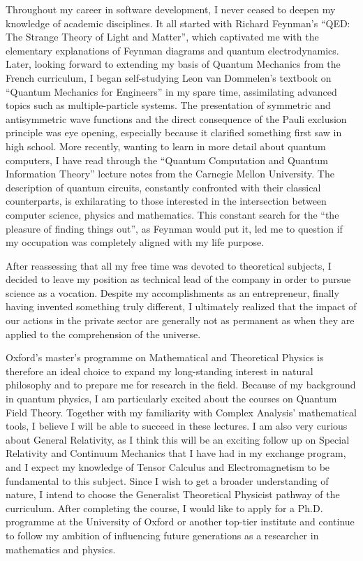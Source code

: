 \documentclass[10pt]{article}
\begin{document}
Throughout my career in software development, I never ceased to deepen my knowledge of academic disciplines. It all started with Richard Feynman's ``QED: The Strange Theory of Light and Matter'', which captivated me with the elementary explanations of Feynman diagrams and quantum electrodynamics. Later, looking forward to extending my basis of Quantum Mechanics from the French curriculum, I began self-studying Leon van Dommelen's textbook on ``Quantum Mechanics for Engineers'' in my spare time, assimilating advanced topics such as multiple-particle systems. The presentation of symmetric and antisymmetric wave functions and the direct consequence of the Pauli exclusion principle was eye opening, especially because it clarified something first saw in high school. More recently, wanting to learn in more detail about quantum computers, I have read through the ``Quantum Computation and Quantum Information Theory'' lecture notes from the Carnegie Mellon University. The description of quantum circuits, constantly confronted with their classical counterparts, is exhilarating to those interested in the intersection between computer science, physics and mathematics. This constant search for the ``the pleasure of finding things out'', as Feynman would put it, led me to question if my occupation was completely aligned with my life purpose.

After reassessing that all my free time was devoted to theoretical subjects, I decided to leave my position as technical lead of the company in order to pursue science as a vocation. Despite my accomplishments as an entrepreneur, finally having invented something truly different, I ultimately realized that the impact of our actions in the private sector are generally not as permanent as when they are applied to the comprehension of the universe.

Oxford's master's programme on Mathematical and Theoretical Physics is therefore an ideal choice to expand my long-standing interest in natural philosophy and to prepare me for research in the field. Because of my background in quantum physics, I am particularly excited about the courses on Quantum Field Theory. Together with my familiarity with Complex Analysis' mathematical tools, I believe I will be able to succeed in these lectures. I am also very curious about General Relativity, as I think this will be an exciting follow up on Special Relativity and Continuum Mechanics that I have had in my exchange program, and I expect my knowledge of Tensor Calculus and Electromagnetism to be fundamental to this subject. Since I wish to get a broader understanding of nature, I intend to choose the Generalist Theoretical Physicist pathway of the curriculum. After completing the course, I would like to apply for a Ph.D. programme at the University of Oxford or another top-tier institute and continue to follow my ambition of influencing future generations as a researcher in mathematics and physics.

\end{document}
